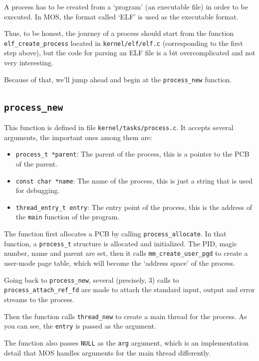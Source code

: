 A process has to be created from a `program' (an executable file) in order to be executed.
In MOS, the format called `ELF' is used as the executable format.

Thus, to be honest, the journey of a process should start from the function \texttt{elf\_create\_process}
located in \texttt{kernel/elf/elf.c} (corresponding to the first step above), but the code for
parsing an ELF file is a bit overcomplicated and not very interesting.

Because of that, we'll jump ahead and begin at the \texttt{process\_new} function.

\subsection{\texttt{process\_new}}

This function is defined in file \texttt{kernel/tasks/process.c}. It accepts several arguments,
the important ones among them are:

\begin{itemize}
    \item \texttt{process\_t *parent}: The parent of the process, this is a pointer to the PCB of the parent.
    \item \texttt{const char *name}: The name of the process, this is just a string that is used for debugging.
    \item \texttt{thread\_entry\_t entry}: The entry point of the process, this is the address of the
          \texttt{main} function of the program.
\end{itemize}

The function first allocates a PCB by calling \texttt{process\_allocate}. In that function, a
\texttt{process\_t} structure is allocated and initialized. The PID, magic number, name and
parent are set, then it calls \texttt{mm\_create\_user\_pgd} to create a user-mode page table,
which will become the `address space' of the process.

Going back to \texttt{process\_new}, several (precisely, 3) calls to \texttt{process\_attach\_ref\_fd}
are made to attach the standard input, output and error streams to the process.

Then the function calls \texttt{thread\_new} to create a main thread for the process. As you can see,
the \texttt{entry} is passed as the argument.

\begin{note}
    \item The function also passes \texttt{NULL} as the \texttt{arg} argument, which is an implementation
    detail that MOS handles arguments for the main thread differently.
\end{note}

